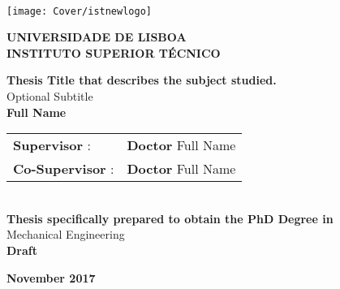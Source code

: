 \setcounter{page}{1} 


\thispagestyle{empty}
\begin{flushleft} ~\\ \vspace{-12mm} \hspace{-12mm}  \texttt{[image: Cover/istnewlogo]} 
 
\centering
\LARGE \textbf{UNIVERSIDADE DE LISBOA \\ INSTITUTO SUPERIOR TÉCNICO}
\vspace{30mm}

 \vspace{5mm}
 
\centering
\LARGE \textbf{Thesis Title that describes the subject studied.}
\\ \vspace{10mm}
\Large Optional Subtitle
\\ \vspace{15mm}
\Large \textbf{Full Name} \\
\vspace{4cm}

\begin{minipage}{\textwidth}
\begin{tabularx}{\textwidth}{ l @{ } l }
\large \textbf{Supervisor} : & \textbf{Doctor} Full Name\\
 \large \textbf{Co-Supervisor} :  & \textbf{Doctor} Full Name\\
\end{tabularx}

\end{minipage}
%
\\ \vspace{27mm}
\centering
\large \textbf{Thesis specifically prepared to obtain the PhD Degree in}\\
\large Mechanical Engineering\\
\vspace{18mm}
\Large \textbf{Draft}
 
\vspace{15mm}

\large \textbf{November 2017} \\
\let\thepage\relax
\end{flushleft}
\pagebreak
